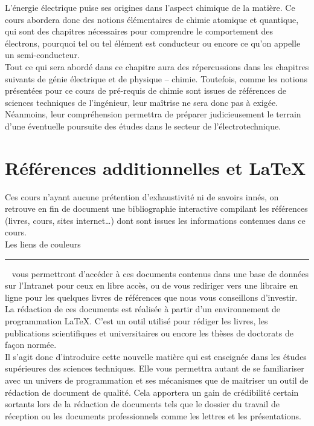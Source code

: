 L'énergie électrique puise ses origines dans l'aspect chimique de la matière. Ce cours abordera donc des notions élémentaires de chimie atomique et quantique, qui sont des chapitres nécessaires pour comprendre le comportement des électrons, pourquoi tel ou tel élément est conducteur ou encore ce qu'on appelle un semi-conducteur.\\Tout ce qui sera abordé dans ce chapitre aura des répercussions dans les chapitres suivants de génie électrique et de physique -- chimie. Toutefois, comme les notions présentées pour ce cours de pré-requis de chimie sont issues de références de sciences techniques de l'ingénieur, leur maîtrise ne sera donc pas à exigée. Néanmoins, leur compréhension permettra de préparer judicieusement le terrain d'une éventuelle poursuite des études dans le secteur de l'électrotechnique.


\section{Références additionnelles et \textrm{\LaTeX}}

Ces cours n'ayant aucune prétention d'exhaustivité ni de savoirs innés, on retrouve en fin de document une bibliographie interactive compilant les références (livres, cours, sites internet\ldots) dont sont issues les informations contenues dans ce cours.\\Les liens de couleurs ~\textcolor{Blue}{\rule{1.5em}{1.2ex}}~ vous permettront d'accéder à ces documents contenus dans une base de données sur l'Intranet pour ceux en libre accès, ou de vous rediriger vers une libraire en ligne pour les quelques livres de références que nous vous conseillons d'investir.\\

La rédaction de ces documents est réalisée à partir d'un environnement de programmation \LaTeX. C'est un outil utilisé pour rédiger les livres, les publications scientifiques et universitaires ou encore les thèses de doctorats de façon normée.\\Il s'agit donc d'introduire cette nouvelle matière qui est enseignée dans les études supérieures des sciences techniques. Elle vous permettra autant de se familiariser avec un univers de programmation et ses mécanismes que de maitriser un outil de rédaction de document de qualité. Cela apportera un gain de crédibilité certain sortants lors de la rédaction de documents tels que le dossier du travail de réception ou les documents professionnels comme les lettres et les présentations.


%